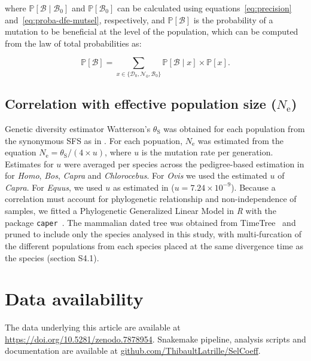 \documentclass[9pt,twocolumn,twoside,lineno]{pnas-new}
\newcommand{\Ne}{N_{\text{e}}}
\newcommand{\proba}{\mathbb{P}}
\newcommand{\SphyDel}{\mathcal{D}_0}
\newcommand{\SphyNeu}{\mathcal{N}_0}
\newcommand{\SphyBen}{\mathcal{B}_0}
\newcommand{\Sphyclass}{x}
\newcommand{\given}{\mid}
\newcommand{\SpopBen}{\mathcal{B}}
\newcommand{\thetaSyn}{\theta_{\text{S}}}
\begin{document}
{       where $\proba [\SpopBen \given \SphyBen]$ and $\proba [ \SphyBen ]$ can be calculated using equations~\ref{eq:precision} and~\ref{eq:proba-dfe-mutsel}, respectively, and $\proba [ \SpopBen ]$ is the probability of a mutation to be beneficial at the level of the population, which can be computed from the law of total probabilities as:

       \begin{equation}
              \proba [ \SpopBen ] = \sum_{\Sphyclass \in \{\SphyDel, \SphyNeu, \SphyBen \} }\proba [\SpopBen \given \Sphyclass ] \times \proba [\Sphyclass ].
              \label{eq:total_proba}
       \end{equation}

       \subsection{Correlation with effective population size ($\Ne$)}
       \label{subsec:correlation-diversity}
       Genetic diversity estimator Watterson's $\thetaSyn$ was obtained for each population from the synonymous SFS as in \cite[Achaz]{achaz_frequency_2009}.
       For each popuation, $\Ne$ was estimated from the equation $\Ne=\thetaSyn / (4 \times u)$, where $u$ is the mutation rate per generation.
       Estimates for $u$ were averaged per species across the pedigree-based estimation in \cite[Bergeron et al]{bergeron_evolution_2023} for \textit{Homo}, \textit{Bos}, \textit{Capra} and \textit{Chlorocebus}.
       For \textit{Ovis} we used the estimated $u$ of \textit{Capra}.
       For \textit{Equus}, we used $u$ as estimated in \cite[Orlando et al]{orlando_recalibrating_2013} ($u=7.24\times10^{-9}$).
       Because a correlation must account for phylogenetic relationship and non-independence of samples, we fitted a Phylogenetic Generalized Linear Model in \textit{R} with the package \texttt{caper}~\cite{orme_caper_2013}.
       The mammalian dated tree was obtained from TimeTree~\cite{kumar_timetree_2017} and pruned to include only the species analysed in this study, with multi-furcation of the different populations from each species placed at the same divergence time as the species (section S4.1).

       \section{Data availability}\label{sec:data-availability}
       The data underlying this article are available at \url{https://doi.org/10.5281/zenodo.7878954}.
       Snakemake pipeline, analysis scripts and documentation are available at \href{https://github.com/ThibaultLatrille/SelCoeff}{github.com/ThibaultLatrille/SelCoeff}.
}
\end{document}
